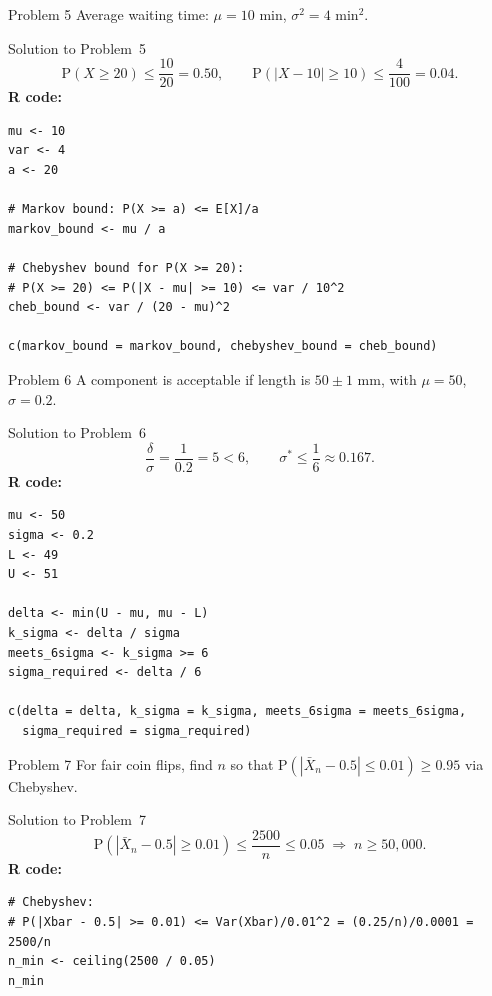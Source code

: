\documentclass[12pt,a4paper]{article}
\renewcommand{\P}{\mathrm{P}}
\begin{document}
\vspace{6pt}

\begin{problembox}{Problem 5}
Average waiting time: $\mu=10$ min, $\sigma^2=4$ min$^2$.
\end{problembox}

\begin{solutionbox}{Solution to Problem~5}
\[
\P(X\ge20)\le\frac{10}{20}=0.50,\qquad
\P(|X-10|\ge10)\le\frac{4}{100}=0.04.
\]
\textbf{R code:}
\begin{lstlisting}[style=rcode]
mu <- 10
var <- 4
a <- 20

# Markov bound: P(X >= a) <= E[X]/a
markov_bound <- mu / a

# Chebyshev bound for P(X >= 20):
# P(X >= 20) <= P(|X - mu| >= 10) <= var / 10^2
cheb_bound <- var / (20 - mu)^2

c(markov_bound = markov_bound, chebyshev_bound = cheb_bound)
\end{lstlisting}
\end{solutionbox}

\vspace{6pt}

\begin{problembox}{Problem 6}
A component is acceptable if length is $50\pm1$ mm, with $\mu=50$, $\sigma=0.2$.
\end{problembox}

\begin{solutionbox}{Solution to Problem~6}
\[
\frac{\delta}{\sigma}=\frac{1}{0.2}=5<6,\qquad
\sigma^*\le\frac{1}{6}\approx0.167.
\]
\textbf{R code:}
\begin{lstlisting}[style=rcode]
mu <- 50
sigma <- 0.2
L <- 49
U <- 51

delta <- min(U - mu, mu - L)
k_sigma <- delta / sigma
meets_6sigma <- k_sigma >= 6
sigma_required <- delta / 6

c(delta = delta, k_sigma = k_sigma, meets_6sigma = meets_6sigma,
  sigma_required = sigma_required)
\end{lstlisting}
\end{solutionbox}

\vspace{6pt}

\begin{problembox}{Problem 7}
For fair coin flips, find $n$ so that
$\P(|\bar X_n-0.5|\le0.01)\ge0.95$ via Chebyshev.
\end{problembox}

\begin{solutionbox}{Solution to Problem~7}
\[
\P(|\bar X_n-0.5|\ge0.01)\le\frac{2500}{n}\le0.05
\;\Rightarrow\;
n\ge50{,}000.
\]
\textbf{R code:}
\begin{lstlisting}[style=rcode]
# Chebyshev:
# P(|Xbar - 0.5| >= 0.01) <= Var(Xbar)/0.01^2 = (0.25/n)/0.0001 = 2500/n
n_min <- ceiling(2500 / 0.05)
n_min
\end{lstlisting}
\end{solutionbox}
\end{document}
